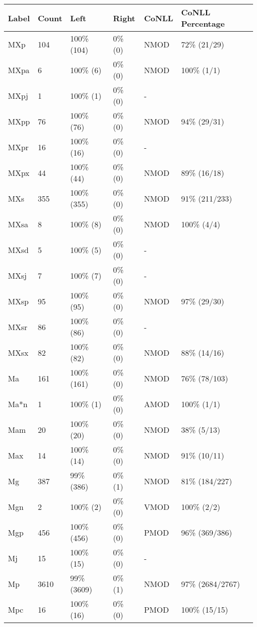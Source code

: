 \begin{figure*}
\begin{tabular}{|l|l|l|l||l|l|}
\hline
Label & Count & Left & Right & CoNLL & CoNLL Percentage\\ 
\hline
 MXp & 104 & 100\% (104) & 0\% (0) & NMOD & 72\% (21/29) \\ 
\hline
 MXpa & 6 & 100\% (6) & 0\% (0) & NMOD & 100\% (1/1) \\ 
\hline
 MXpj & 1 & 100\% (1) & 0\% (0) & - &  \\ 
\hline
 MXpp & 76 & 100\% (76) & 0\% (0) & NMOD & 94\% (29/31) \\ 
\hline
 MXpr & 16 & 100\% (16) & 0\% (0) & - &  \\ 
\hline
 MXpx & 44 & 100\% (44) & 0\% (0) & NMOD & 89\% (16/18) \\ 
\hline
 MXs & 355 & 100\% (355) & 0\% (0) & NMOD & 91\% (211/233) \\ 
\hline
 MXsa & 8 & 100\% (8) & 0\% (0) & NMOD & 100\% (4/4) \\ 
\hline
 MXsd & 5 & 100\% (5) & 0\% (0) & - &  \\ 
\hline
 MXsj & 7 & 100\% (7) & 0\% (0) & - &  \\ 
\hline
 MXsp & 95 & 100\% (95) & 0\% (0) & NMOD & 97\% (29/30) \\ 
\hline
 MXsr & 86 & 100\% (86) & 0\% (0) & - &  \\ 
\hline
 MXsx & 82 & 100\% (82) & 0\% (0) & NMOD & 88\% (14/16) \\ 
\hline
 Ma & 161 & 100\% (161) & 0\% (0) & NMOD & 76\% (78/103) \\ 
\hline
 Ma*n & 1 & 100\% (1) & 0\% (0) & AMOD & 100\% (1/1) \\ 
\hline
 Mam & 20 & 100\% (20) & 0\% (0) & NMOD & 38\% (5/13) \\ 
\hline
 Max & 14 & 100\% (14) & 0\% (0) & NMOD & 91\% (10/11) \\ 
\hline
 Mg & 387 & 99\% (386) & 0\% (1) & NMOD & 81\% (184/227) \\ 
\hline
 Mgn & 2 & 100\% (2) & 0\% (0) & VMOD & 100\% (2/2) \\ 
\hline
 Mgp & 456 & 100\% (456) & 0\% (0) & PMOD & 96\% (369/386) \\ 
\hline
 Mj & 15 & 100\% (15) & 0\% (0) & - &  \\ 
\hline
 Mp & 3610 & 99\% (3609) & 0\% (1) & NMOD & 97\% (2684/2767) \\ 
\hline
 Mpc & 16 & 100\% (16) & 0\% (0) & PMOD & 100\% (15/15) \\ 
\hline

\end{tabular}
\end{figure*}
